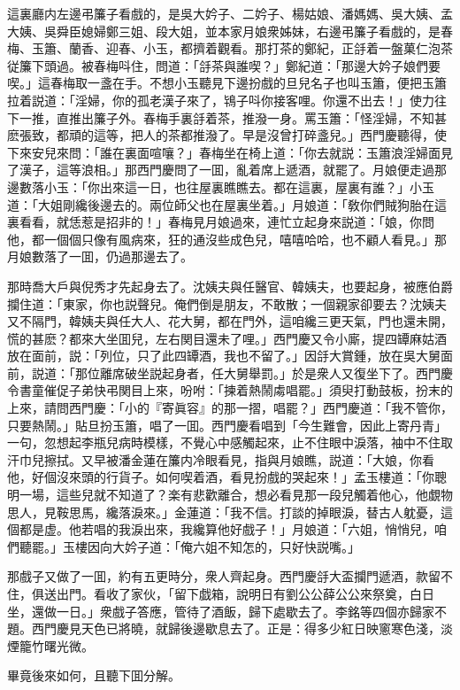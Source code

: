 這裏廳内左邊弔簾子看戲的，是吳大妗子、二妗子、楊姑娘、潘媽媽、吳大姨、孟大姨、吳舜臣媳婦鄭三姐、段大姐，並本家月娘衆姊妹，右邊弔簾子看戲的，是春梅、玉簫、蘭香、迎春、小玉，都擠着觀看。那打茶的鄭紀，正㧱着一盤菓仁泡茶従簾下頭過。被春梅呌住，問道：「㧱茶與誰喫？」鄭紀道：「那邊大妗子娘們要喫。」這春梅取一盞在手。不想小玉聽見下邊扮戲的旦兒名子也叫玉簫，便把玉簫拉着説道：「淫婦，你的孤老漢子來了，鴇子呌你接客哩。你還不出去！」使力往下一推，直推出簾子外。春梅手裏㧱着茶，推潑一身。罵玉簫：「怪淫婦，不知甚麽張致，都頑的這等，把人的茶都推潑了。早是沒曾打碎盞兒。」西門慶聽得，使下來安兒來問：「誰在裏面喧嚷？」春梅坐在椅上道：「你去就説：玉簫浪淫婦面見了漢子，這等浪相。」那西門慶問了一囬，亂着席上遞酒，就罷了。月娘便走過那邊數落小玉：「你出來這一日，也往屋裏瞧瞧去。都在這裏，屋裏有誰？」小玉道：「大姐剛纔後邊去的。兩位師父也在屋裏坐着。」月娘道：「敎你們賊狗胎在這裏看看，就恁惹是招非的！」春梅見月娘過來，連忙立起身來説道：「娘，你問他，都一個個只像有風病來，狂的通沒些成色兒，嘻嘻哈哈，也不顧人看見。」那月娘數落了一囬，仍過那邊去了。

那時喬大戶與倪秀才先起身去了。沈姨夫與任醫官、韓姨夫，也要起身，被應伯爵攔住道：「東家，你也説聲兒。俺們倒是朋友，不敢散；一個親家卻要去？沈姨夫又不隔門，韓姨夫與任大人、花大舅，都在門外，這咱纔三更天氣，門也還未開，慌的甚麽？都來大坐囬兒，左右関目還未了哩。」西門慶又令小廝，提四罈麻姑酒放在面前，説：「列位，只了此四罈酒，我也不留了。」因㧱大賞鍾，放在吳大舅面前，説道：「那位離席破坐説起身者，任大舅舉罰。」於是衆人又復坐下了。西門慶令書童催促子弟快弔関目上來，吩咐：「揀着熱鬧䖏唱罷。」須臾打動鼓板，扮末的上來，請問西門慶：「小的『寄眞容』的那一摺，唱罷？」西門慶道：「我不管你，只要熱鬧。」貼旦扮玉簫，唱了一囬。西門慶看唱到「今生難會，因此上寄丹青」一句，忽想起李瓶兒病時模樣，不覺心中感觸起來，止不住眼中淚落，袖中不住取汗巾兒擦拭。又早被潘金蓮在簾内冷眼看見，指與月娘瞧，説道：「大娘，你看他，好個沒來頭的行貨子。如何喫着酒，看見扮戲的哭起來！」孟玉樓道：「你聰明一場，這些兒就不知道了？楽有悲歡離合，想必看見那一段兒觸着他心，他覷物思人，見鞍思馬，纔落淚來。」金蓮道：「我不信。打談的掉眼淚，替古人躭憂，這個都是虚。他若唱的我淚出來，我纔算他好戲子！」月娘道：「六姐，悄悄兒，咱們聽罷。」玉樓因向大妗子道：「俺六姐不知怎的，只好快説嘴。」

那戲子又做了一囬，約有五更時分，衆人齊起身。西門慶㧱大盃攔門遞酒，款留不住，俱送出門。看收了家伙，「留下戯箱，說明日有劉公公薛公公來祭奠，白日坐，還做一日。」衆戲子答應，管待了酒飯，歸下處歇去了。李銘等四個亦歸家不題。西門慶見天色已將曉，就歸後邊歇息去了。正是：得多少紅日映窻寒色淺，淡煙籠竹曙光微。

畢竟後來如何，且聽下囬分解。


